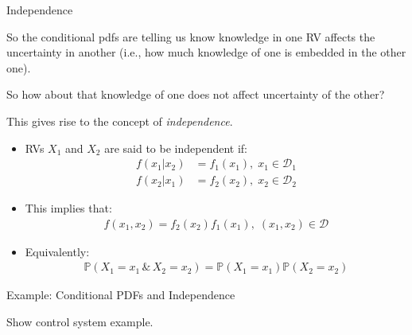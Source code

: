 \documentclass[9pt]{beamer}
\begin{document}
%
\begin{frame}{Independence}

So the conditional pdfs are telling us know knowledge in one RV affects the uncertainty in another (i.e., how much knowledge of one is embedded in the other one). 
\begin{block}{}
So how about that knowledge of one does not affect uncertainty of the other? 
\end{block}
This gives rise to the concept of {\em independence}.
\begin{itemize}
\item RVs $X_1$ and $X_2$ are said to be independent if:
\begin{align*}
f(x_1|x_2)&=f_1(x_1),\; x_1\in \mathcal{D}_1\\
f(x_2|x_1)&=f_2(x_2),\; x_2\in \mathcal{D}_2
\end{align*}
\item This implies that:
 \begin{align*}
{f(x_1,x_2)}={f_2(x_2)}f_1(x_1),\; (x_1,x_2)\in \mathcal{D}
\end{align*}
\item Equivalently:
 \begin{align*}
\mathbb{P}(X_1=x_1\,\&\,X_2=x_2)=\mathbb{P}(X_1=x_1)\mathbb{P}(X_2=x_2)
\end{align*}

\end{itemize}

\end{frame}

%
\begin{frame}{Example: Conditional PDFs and Independence}

\begin{block}{}
{\color{red} Show control system example.}
\end{block}

\end{frame}
\end{document}
